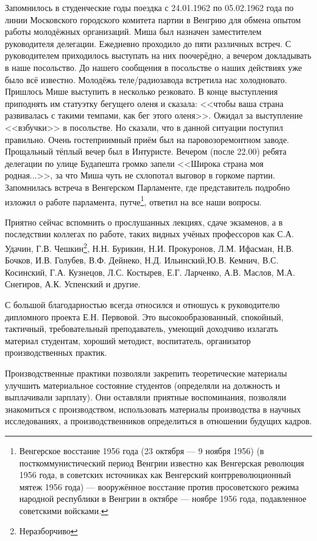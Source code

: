 Запомнилось в студенческие годы поездка с 24.01.1962 по 05.02.1962 года по линии Московского городского комитета партии в Венгрию для обмена опытом работы молодёжных организаций. Миша был назначен заместителем руководителя делегации. Ежедневно проходило до пяти различных встреч. С руководителем приходилось выступать на них поочерёдно, а вечером докладывать в наше посольство. До нашего сообщения в посольстве о наших действиях уже было всё известно. Молодёжь теле\-/радиозавода встретила нас холодновато. Пришлось Мише выступить в несколько резковато. В конце выступления приподнять им статуэтку бегущего оленя и сказала: <<чтобы ваша страна развивалась с такими темпами, как бег этого оленя>>. Ожидал за выступление <<взбучки>> в посольстве. Но сказали, что в данной ситуации поступил правильно. Очень гостеприимный приём был на паровозоремонтном заводе. Прощальный тёплый вечер был в Интуристе. Вечером (после 22.00) ребята делегации по улице Будапешта громко запели <<Широка страна моя родная...>>, за что Миша чуть не схлопотал выговор в горкоме партии. Запомнилась встреча в Венгерском Парламенте, где представитель подробно изложил о работе парламента, путче\footnote{Венгерское восстание 1956 года (23 октября — 9 ноября 1956) (в посткоммунистический период Венгрии известно как Венгерская революция 1956 года, в советских источниках как Венгерский контрреволюционный мятеж 1956 года) — вооружённое восстание против просоветского режима народной республики в Венгрии в октябре — ноябре 1956 года, подавленное советскими войсками.}, ответил на все наши вопросы.

Приятно сейчас вспомнить о прослушанных лекциях, сдаче экзаменов, а в последствии коллегах по работе, таких видных учёных профессоров как С.А. Удачин, Г.В. Чешкин\footnote{Неразборчиво}, Н.Н. Бурикин, Н.И. Прокуронов, Л.М. Ифасман, Н.В. Бочков, И.В. Голубев, В.Ф. Дейнеко, Н.Д. Ильинский,Ю.В. Кемнич, В.С. Косинский, Г.А. Кузнецов, Л.С. Костырев, Е.Г. Ларченко, А.В. Маслов, М.А. Снегиров, А.К. Успенский и другие.

С большой благодарностью всегда относился и отношусь к руководителю дипломного проекта Е.Н. Первовой. Это высокообразованный, спокойный, тактичный, требовательный преподаватель, умеющий доходчиво излагать материал студентам, хороший методист, воспитатель, организатор производственных практик.

Производственные практики позволяли закрепить теоретические материалы улучшить материальное состояние студентов (определяли на должность и выплачивали зарплату). Они оставляли приятные воспоминания, позволяли знакомиться с производством, использовать материалы производства в научных исследованиях, а производственников определиться в отношении будущих кадров.

